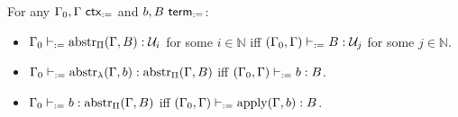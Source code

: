 \documentclass[twoside]{report}
\begin{document}
\begin{proposition}
\label{thm:context_environment_abstr_apply}
For any $\Gamma_0, \Gamma \ \mathsf{ctx}_{:=}$ and $b, B \ \mathsf{term}_{:=}$:
\begin{itemize}[noitemsep]
    \item $\Gamma_0 \vdash_{:=} \operatorname{abstr}_\Pi(\Gamma, B) : \mathcal U_i$ for some $i \in \mathbb N$ iff $(\Gamma_0, \Gamma) \vdash_{:=} B : \mathcal U_j$ for some $j \in \mathbb N$.
    \item $\Gamma_0 \vdash_{:=} \operatorname{abstr}_\lambda(\Gamma, b) : \operatorname{abstr}_\Pi(\Gamma, B)$ iff $(\Gamma_0, \Gamma) \vdash_{:=} b : B$.
    \item $\Gamma_0 \vdash_{:=} b : \operatorname{abstr}_\Pi(\Gamma, B)$ iff $(\Gamma_0, \Gamma) \vdash_{:=} \operatorname{apply}(\Gamma, b) : B$.
\end{itemize}
\end{proposition}
\end{document}
